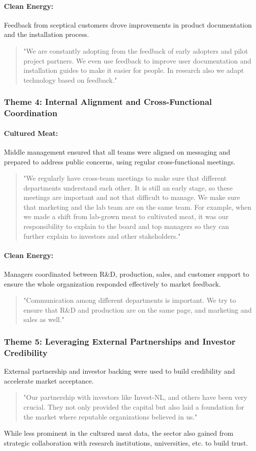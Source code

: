 \paragraph{Clean Energy:} Feedback from sceptical customers drove improvements in product documentation and the installation process.
\begin{quote}
	"We are constantly adopting from the feedback of early adopters and pilot project partners. We even use feedback to improve user documentation and installation guides to make it easier for people. In research also we adapt technology based on feedback."
\end{quote}

\subsubsection{Theme 4: Internal Alignment and Cross-Functional Coordination}
\paragraph{Cultured Meat:} Middle management ensured that all teams were aligned on messaging and prepared to address public concerns, using regular cross-functional meetings.
\begin{quote}
	"We regularly have cross-team meetings to make sure that different departments understand each other. It is still an early stage, so these meetings are important and not that difficult to manage. We make sure that marketing and the lab team are on the same team. For example, when we made a shift from lab-grown meat to cultivated meat, it was our responsibility to explain to the board and top managers so they can further explain to investors and other stakeholders."
\end{quote}

\paragraph{Clean Energy:} Managers coordinated between R\&D, production, sales, and customer support to ensure the whole organization responded effectively to market feedback.
\begin{quote}
	"Communication among different departments is important. We try to ensure that R\&D and production are on the same page, and marketing and sales as well."
\end{quote}

\subsubsection{Theme 5: Leveraging External Partnerships and Investor Credibility}
External partnership and investor backing were used to build credibility and accelerate market acceptance.
\begin{quote}
	"Our partnership with investors like Invest-NL, and others have been very crucial. They not only provided the capital but also laid a foundation for the market where reputable organizations believed in us."
\end{quote}
While less prominent in the cultured meat data, the sector also gained from strategic collaboration with research institutions, universities, etc. to build trust.

